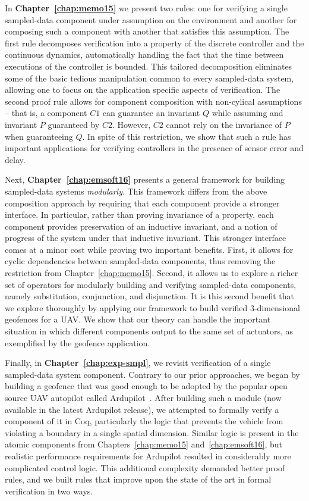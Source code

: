 \documentclass[12pt]{ucsddissertation}
\begin{document}
\begin{dissertationintroduction}
In \textbf{Chapter~\ref{chap:memo15}} we present two rules: one for
verifying a single sampled-data component under assumption on the
environment and another for composing such a component with another that
satisfies this assumption. The first rule decomposes verification into a
property of the discrete controller and the continuous dynamics,
automatically handling the fact that the time between executions of the
controller is bounded. This tailored decomposition eliminates some of the
basic tedious manipulation common to every sampled-data system, allowing
one to focus on the application specific aspects of verification. The
second proof rule allows for component composition with non-cylical
assumptions -- that is, a component $C1$ can guarantee an invariant $Q$
while assuming and invariant $P$ guaranteed by $C2$. However, $C2$ cannot
rely on the invariance of $P$ when guaranteeing $Q$. In spite of this
restriction, we show that such a rule has important applications for
verifying controllers in the presence of sensor error and delay.

Next, \textbf{Chapter~\ref{chap:emsoft16}} presents a general framework for
building sampled-data systems \emph{modularly}. This framework differs from
the above composition approach by requiring that each component provide a
stronger interface. In particular, rather than proving invariance of a
property, each component provides preservation of an inductive invariant,
and a notion of progress of the system under that inductive invariant. This
stronger interface comes at a minor cost while proving two important
benefits. First, it allows for cyclic dependencies between sampled-data
components, thus removing the restriction from
Chapter~\ref{chap:memo15}. Second, it allows us to explore a richer set of
operators for modularly building and verifying sampled-data components,
namely substitution, conjunction, and disjunction. It is this second
benefit that we explore thoroughly by applying our framework to build
verified 3-dimensional geofences for a UAV. We show that our theory can
handle the important situation in which different components output to the
same set of actuators, as exemplified by the geofence application.

Finally, in \textbf{Chapter~\ref{chap:exp-smpl}}, we revisit verification
of a single sampled-data system component. Contrary to our prior
approaches, we began by building a geofence that was good enough to be
adopted by the popular open source UAV autopilot called
Ardupilot~\cite{ardupilot}. After building such a module (now available in the
latest Ardupilot release), we attempted to formally verify a component of
it in Coq, particularly the logic that prevents the vehicle from violating
a boundary in a single spatial dimension. Similar logic is present in the
atomic components from Chapters~\ref{chap:memo15} and~\ref{chap:emsoft16},
but realistic performance requirements for Ardupilot resulted in
considerably more complicated control logic. This additional complexity
demanded better proof rules, and we built rules that improve upon the state
of the art in formal verification in two ways.


\end{dissertationintroduction}
\end{document}
